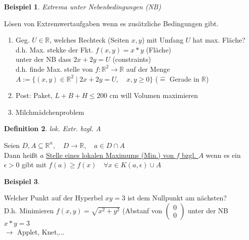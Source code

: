 \documentclass[a4paper,11pt]{article}
\newtheorem{definition}{Definition}[section]
\newtheorem{bsp}[definition]{Beispiel}
\begin{document}
\begin{bsp}
	Extrema unter Nebenbedingungen (NB)
\end{bsp}
Lösen von Extremwertaufgaben wenn es zusätzliche Bedingungen gibt.
\begin{enumerate}[label=\alph*)]
	\item Geg. $U\in\mathbb{R}$, welches Rechteck (Seiten $x,y$) mit Umfang $U$ hat max. Fläche? \\
	d.h. Max. stekke der Fkt. $f(x,y)=x*y$ (Fläche) \\
	unter der NB dass $2x+2y=U$ (constraints) \\
	d.h. finde Max. stelle von $f\colon\mathbb{R}^2\to\mathbb{R}$ auf der Menge \\
	$A:=\{(x,y)\in\mathbb{R}^2\mid 2x+2y=U,\quad x,y\geq0\}$ ($\widehat{=}$ Gerade in $\mathbb{R}$)
	\item Post: Paket, $L+B+H\leq200$ cm will Volumen maximieren
	\item Milchmädchenproblem
\end{enumerate}

\begin{definition}
	lok. Extr. bzgl. A
\end{definition}
Seien $D,A\subseteq\mathbb{R}^n,\quad D\to\mathbb{R},\quad a\in D\cap A$ \\
Dann heißt $a$ \underline{Stelle eines lokalen Maximums (Min.) von $f$ bzgl. $A$} wenn es ein $\epsilon>0$ gibt mit $f(a)\geq f(x)\quad\forall x\in K(a,\epsilon)\cup A$

\begin{bsp}
\end{bsp}
Welcher Punkt auf der Hyperbel $xy=3$ ist dem Nullpunkt am nächsten? \\
D.h. Minimieren $f(x,y)=\sqrt{x^2+y^2}$ (Abstanf von $\begin{pmatrix}0\\0\end{pmatrix}$ unter der NB $x*y=3$ \\
$\rightarrow$ Applet, Knet,...
\end{document}
